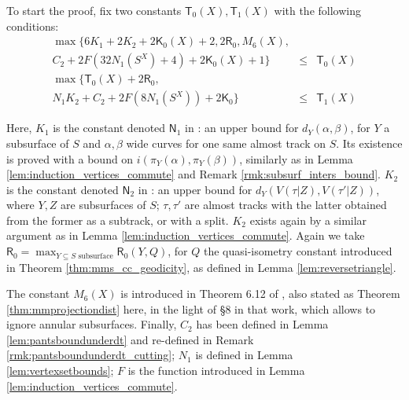 To start the proof, fix two constants $\mathsf{T}_0(X),\mathsf{T}_1(X)$ with the following conditions:
\begin{eqnarray*}
\max\{6K_1+2K_2+2\mathsf{K}_0(X)+2,2\mathsf{R}_0, M_6(X), & & \\
 C_2+2F(32N_1(S^X)+4)+2\mathsf{K}_0(X)+1\} & \leq & \mathsf{T}_0(X) \\
\max\{\mathsf{T}_0(X)+2\mathsf{R}_0, & & \\
N_1K_2 + C_2 + 2 F\left(8 N_1(S^X)\right)+2\mathsf{K}_0\} & \leq & \mathsf{T}_1(X)
\end{eqnarray*}

Here, $K_1$ is the constant denoted $\mathsf{N}_1$ in \cite{mms}: an upper bound for $d_Y(\alpha,\beta)$, for $Y$ a subsurface of $S$ and $\alpha,\beta$ wide curves for one same almost track on $S$. Its existence is proved with a bound on $i(\pi_Y(\alpha),\pi_Y(\beta))$, similarly as in Lemma \ref{lem:induction_vertices_commute} and Remark \ref{rmk:subsurf_inters_bound}. $K_2$ is the constant denoted $\mathsf{N}_2$ in \cite{mms}: an upper bound for $d_Y(V(\tau|Z),V(\tau'|Z))$, where $Y,Z$ are subsurfaces of $S$; $\tau,\tau'$ are almost tracks with the latter obtained from the former as a subtrack, or with a split. $K_2$ exists again by a similar argument as in Lemma \ref{lem:induction_vertices_commute}. Again we take $\mathsf{R}_0=\max_{Y\subseteq S \text{ subsurface}} \mathsf{R}_0(Y,Q)$, for $Q$ the quasi-isometry constant introduced in Theorem \ref{thm:mms_cc_geodicity}, as defined in Lemma \ref{lem:reversetriangle}.

The constant $M_6(X)$ is introduced in Theorem 6.12 of \cite{masurminskyii}, also stated as Theorem \ref{thm:mmprojectiondist} here, in the light of \S 8 in that work, which allows to ignore annular subsurfaces. Finally, $C_2$ has been defined in Lemma \ref{lem:pantsboundunderdt} and re-defined in Remark \ref{rmk:pantsboundunderdt_cutting}; $N_1$ is defined in Lemma \ref{lem:vertexsetbounds}; $F$ is the function introduced in Lemma \ref{lem:induction_vertices_commute}.

